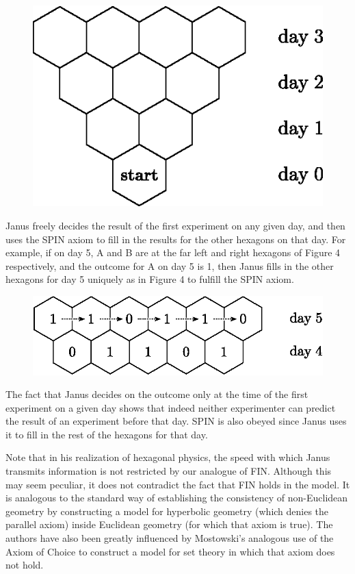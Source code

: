 \documentclass[12pt]{amsart}
\begin{document}
\begin{figure}[!h]
\centering
\includegraphics{Hex2.eps}
\caption{}
\end{figure}

  Janus freely decides the result of the first experiment on any given day,
and then uses the SPIN axiom to fill in the results for the other hexagons on
that day.  For example, if on day 5, A and B are at the far left and right hexagons 
of Figure 4 respectively, and the outcome for A on day 5 is 1, then Janus fills in the
other hexagons for day 5 uniquely as in Figure 4 to fulfill the SPIN axiom. 


\begin{figure}[!h]
\centering
\includegraphics{Hex3.eps}
\caption{}
\end{figure}


The fact that Janus decides on the outcome only at the time of the first
experiment on a given day shows that indeed neither experimenter can
predict the result of an experiment before that day.  SPIN is
also obeyed since Janus uses it to fill in the rest of the hexagons for
that day.

Note that in his realization of hexagonal physics, the speed with which
Janus transmits information is not restricted by our analogue of FIN. Although this 
may seem peculiar, it does not contradict the fact that FIN holds in the model.  It is analogous to the standard way of establishing the consistency of non-Euclidean geometry by constructing a model for hyperbolic geometry (which denies the parallel axiom) inside Euclidean geometry (for which that axiom is true).  The authors have also been greatly influenced by Mostowski's analogous use of the Axiom of Choice to construct a model for 
set theory in which that axiom does not hold. 
\end{document}
